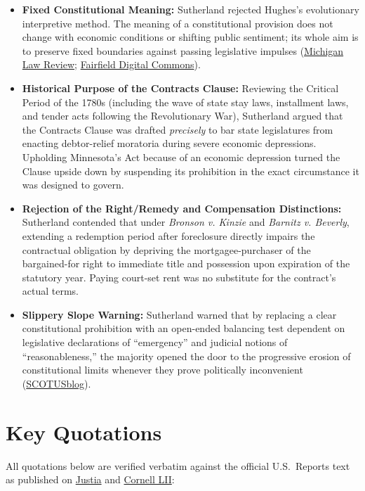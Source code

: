 \documentclass[12pt]{article}
\begin{document}
\begin{itemize}
  \item \textbf{Fixed Constitutional Meaning:} Sutherland rejected Hughes's evolutionary interpretive method. The meaning of a constitutional provision does not change with economic conditions or shifting public sentiment; its whole aim is to preserve fixed boundaries against passing legislative impulses (\href{https://repository.law.umich.edu/cgi/viewcontent.cgi?article=2353&context=mlr}{Michigan Law Review}; \href{https://digitalcommons.fairfield.edu/cgi/viewcontent.cgi?referer=&httpsredir=1&article=1061&context=nealsb}{Fairfield Digital Commons}).
  \item \textbf{Historical Purpose of the Contracts Clause:} Reviewing the Critical Period of the 1780s (including the wave of state stay laws, installment laws, and tender acts following the Revolutionary War), Sutherland argued that the Contracts Clause was drafted \emph{precisely} to bar state legislatures from enacting debtor-relief moratoria during severe economic depressions. Upholding Minnesota's Act because of an economic depression turned the Clause upside down by suspending its prohibition in the exact circumstance it was designed to govern.
  \item \textbf{Rejection of the Right/Remedy and Compensation Distinctions:} Sutherland contended that under \emph{Bronson v. Kinzie} and \emph{Barnitz v. Beverly}, extending a redemption period after foreclosure directly impairs the contractual obligation by depriving the mortgagee-purchaser of the bargained-for right to immediate title and possession upon expiration of the statutory year. Paying court-set rent was no substitute for the contract's actual terms.
  \item \textbf{Slippery Slope Warning:} Sutherland warned that by replacing a clear constitutional prohibition with an open-ended balancing test dependent on legislative declarations of ``emergency'' and judicial notions of ``reasonableness,'' the majority opened the door to the progressive erosion of constitutional limits whenever they prove politically inconvenient (\href{https://www.scotusblog.com/2026/02/scotustoday-for-thursday-february-12/}{SCOTUSblog}).
\end{itemize}

\section{Key Quotations}

All quotations below are verified verbatim against the official U.S.\ Reports text as published on \href{https://supreme.justia.com/cases/federal/us/290/398/}{Justia} and \href{https://www.law.cornell.edu/supremecourt/text/290/398}{Cornell LII}:
\end{document}

